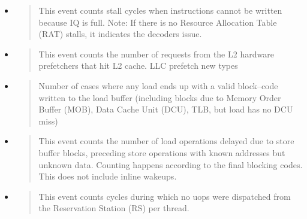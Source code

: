 \begin{itemize}
\item {}
\begin{quotation}
This event counts stall cycles when instructions cannot be written because IQ is
full. Note: If there is no Resource Allocation Table (RAT) stalls, it indicates
the decoders issue.
\end{quotation}

\item {}
\begin{quotation}
This event counts the number of requests from the L2 hardware prefetchers that
hit L2 cache. LLC prefetch new types
\end{quotation}

\item {}
\begin{quotation}
Number of cases where any load ends up with a valid block--code written to the
load buffer (including blocks due to Memory Order Buffer (MOB), Data Cache Unit
(DCU), TLB, but load has no DCU miss)
\end{quotation}

\item {}
\begin{quotation}
This event counts the number of load operations delayed due to store buffer
blocks, preceding store operations with known addresses but unknown data.
Counting happens according to the final blocking codes. This does not include
inline wakeups.
\end{quotation}

\item {}
\begin{quotation}
This event counts cycles during which no uops were dispatched from the
Reservation Station (RS) per thread.
\end{quotation}

\end{itemize}
